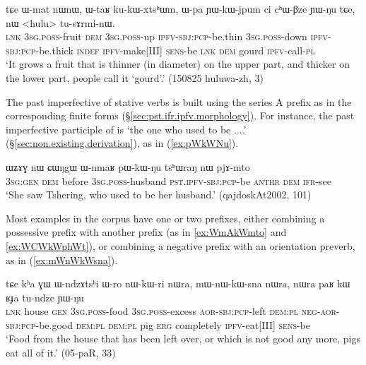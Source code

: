 \begin{exe}
\ex \label{ex:YWkWjpum2}
 \gll  tɕe ɯ-mat nɯnɯ, ɯ-taʁ ku-kɯ-xtsʰɯm, ɯ-pa ɲɯ-kɯ-jpum ci cʰɯ-βze ɲɯ-ŋu tɕe, nɯ <hulu> tu-sɤrmi-nɯ. \\
 \textsc{lnk} \textsc{3sg}.\textsc{poss}-fruit \textsc{dem} \textsc{3sg}.\textsc{poss}-up \textsc{ipfv}-\textsc{sbj}:\textsc{pcp}-be.thin \textsc{3sg}.\textsc{poss}-down \textsc{ipfv}-\textsc{sbj}:\textsc{pcp}-be.thick \textsc{indef} \textsc{ipfv}-make[III]  \textsc{sens}-be \textsc{lnk} \textsc{dem} gourd \textsc{ipfv}-call-\textsc{pl} \\
 \glt `It grows a fruit that is thinner (in diameter) on the upper part, and thicker on the lower part, people call it `gourd'.' (150825 huluwa-zh, 3)
\end{exe}

The past imperfective of stative verbs is built using the series A prefix  as in the corresponding finite forms (§\ref{sec:pst.ifr.ipfv.morphology}). For instance, the past imperfective participle of  is  `the one who used to be ....' (§\ref{sec:non.existing.derivation}), as in (\ref{ex:pWkWNu}).

\begin{exe}
\ex \label{ex:pWkWNu}
 \gll  ɯʑɤɣ nɯ ɕɯŋgɯ ɯ-nmaʁ pɯ-kɯ-ŋu tsʰɯraŋ nɯ pjɤ-mto \\
 \textsc{3sg}:\textsc{gen} \textsc{dem} before \textsc{3sg}.\textsc{poss}-husband \textsc{pst}.\textsc{ipfv}-\textsc{sbj}:\textsc{pcp}-be  \textsc{anthr} \textsc{dem} \textsc{ifr}-see \\
\glt `She saw Tshering, who used to be her husband.' (qajdoskAt2002, 101)
\end{exe}

Most examples in the corpus have one or two prefixes, either combining a possessive prefix with another prefix (as in \ref{ex:WmAkWmto} and \ref{ex:WCWkWphWt}), or combining a negative prefix with an orientation preverb, as in (\ref{ex:mWnWkWsna}).

 \begin{exe}
\ex \label{ex:mWnWkWsna}
 \gll tɕe kʰa ɣɯ ɯ-ndzɤtsʰi ɯ-ro nɯ-kɯ-ri nɯra, mɯ-nɯ-kɯ-sna nɯra, nɯra paʁ kɯ ʁɟa tu-ndze ɲɯ-ŋu \\
 \textsc{lnk} house \textsc{gen} \textsc{3sg}.\textsc{poss}-food \textsc{3sg}.\textsc{poss}-excess \textsc{aor}-\textsc{sbj}:\textsc{pcp}-left \textsc{dem}:\textsc{pl}  \textsc{neg}-\textsc{aor}-\textsc{sbj}:\textsc{pcp}-be.good \textsc{dem}:\textsc{pl} \textsc{dem}:\textsc{pl} pig \textsc{erg} completely  \textsc{ipfv}-eat[III] \textsc{sens}-be \\
 \glt  `Food from the house that has been left over, or which is not good any more, pigs eat all of it.' (05-paR, 33)
\end{exe}

